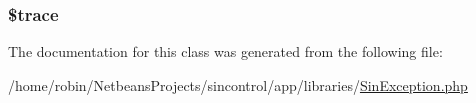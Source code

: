 \subsubsection[{\$trace}]{\setlength{\rightskip}{0pt plus 5cm}\$trace\hspace{0.3cm}{\ttfamily [private]}}\label{class_sin_exception_a6983ad0ef833074b1af98e16d68ff4db}


The documentation for this class was generated from the following file\+:\begin{DoxyCompactItemize}
\item 
/home/robin/\+Netbeans\+Projects/sincontrol/app/libraries/\hyperlink{_sin_exception_8php}{Sin\+Exception.\+php}\end{DoxyCompactItemize}
